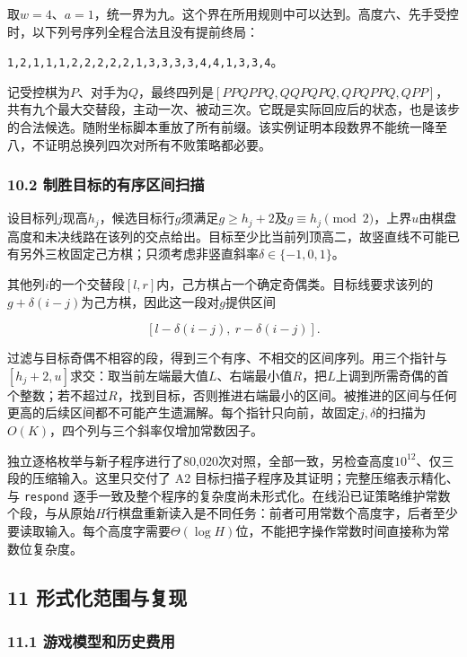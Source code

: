 \documentclass[
  a4paper,
]{article}
\begin{document}
取\(w=4\)、\(a=1\)，统一界为九。这个界在所用规则中可以达到。高度六、先手受控时，以下列号序列全程合法且没有提前终局：

\texttt{1,2,1,1,1,2,2,2,2,2,1,3,3,3,3,4,4,1,3,3,4}。

记受控棋为\(P\)、对手为\(Q\)，最终四列是\([PPQPPQ,QQPQPQ,QPQPPQ,QPP]\)，共有九个最大交替段，主动一次、被动三次。它既是实际回应后的状态，也是该步的合法候选。随附坐标脚本重放了所有前缀。该实例证明本段数界不能统一降至八，不证明总换列四次对所有不败策略都必要。

\subsubsection{10.2
制胜目标的有序区间扫描}\label{ux5236ux80dcux76eeux6807ux7684ux6709ux5e8fux533aux95f4ux626bux63cf}

设目标列\(j\)现高\(h_j\)，候选目标行\(g\)须满足\(g\ge h_j+2\)及\(g\equiv h_j\pmod2\)，上界\(u\)由棋盘高度和未决线路在该列的交点给出。目标至少比当前列顶高二，故竖直线不可能已有另外三枚固定己方棋；只须考虑非竖直斜率\(\delta\in\{-1,0,1\}\)。

其他列\(i\)的一个交替段\([l,r]\)内，己方棋占一个确定奇偶类。目标线要求该列的\(g+\delta(i-j)\)为己方棋，因此这一段对\(g\)提供区间

\[[l-\delta(i-j),\ r-\delta(i-j)].\]

过滤与目标奇偶不相容的段，得到三个有序、不相交的区间序列。用三个指针与\([h_j+2,u]\)求交：取当前左端最大值\(L\)、右端最小值\(R\)，把\(L\)上调到所需奇偶的首个整数；若不超过\(R\)，找到目标，否则推进右端最小的区间。被推进的区间与任何更高的后续区间都不可能产生遗漏解。每个指针只向前，故固定\(j,\delta\)的扫描为\(O(K)\)，四个列与三个斜率仅增加常数因子。

独立逐格枚举与新子程序进行了80,020次对照，全部一致，另检查高度\(10^{12}\)、仅三段的压缩输入。这里只交付了
A2 目标扫描子程序及其证明；完整压缩表示精化、与 \texttt{respond}
逐手一致及整个程序的复杂度尚未形式化。在线沿已证策略维护常数个段，与从原始\(H\)行棋盘重新读入是不同任务：前者可用常数个高度字，后者至少要读取输入。每个高度字需要\(\Theta(\log H)\)位，不能把字操作常数时间直接称为常数位复杂度。

\subsection{11
形式化范围与复现}\label{ux5f62ux5f0fux5316ux8303ux56f4ux4e0eux590dux73b0}

\subsubsection{11.1
游戏模型和历史费用}\label{ux6e38ux620fux6a21ux578bux548cux5386ux53f2ux8d39ux7528}
\end{document}
